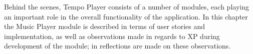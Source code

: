 Behind the scenes, Tempo Player consists of a number of modules, each playing an important role in the overall functionality of the application. In this chapter the Music Player module is described in terms of user stories and implementation, as well as observations made in regards to XP during development of the module; in  reflections are made on these observations.
